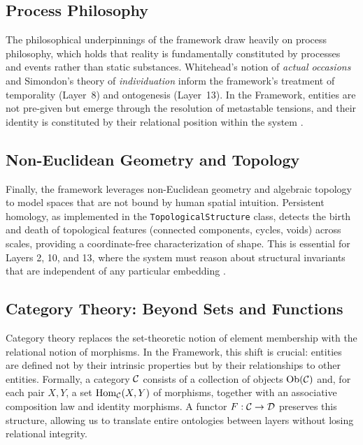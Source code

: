 \subsection{Process Philosophy}
The philosophical underpinnings of the framework draw heavily on process philosophy, which holds that reality is fundamentally constituted by processes and events rather than static substances. Whitehead's notion of \textit{actual occasions} and Simondon's theory of \textit{individuation} inform the framework's treatment of temporality (Layer~8) and ontogenesis (Layer~13). In the \Apeiron{} Framework, entities are not pre-given but emerge through the resolution of metastable tensions, and their identity is constituted by their relational position within the system \cite{simondon1992, prigogine1984}.

\subsection{Non-Euclidean Geometry and Topology}
Finally, the framework leverages non-Euclidean geometry and algebraic topology to model spaces that are not bound by human spatial intuition. Persistent homology, as implemented in the \texttt{TopologicalStructure} class, detects the birth and death of topological features (connected components, cycles, voids) across scales, providing a coordinate-free characterization of shape. This is essential for Layers 2, 10, and 13, where the system must reason about structural invariants that are independent of any particular embedding \cite{edelsbrunner2010}.

\subsection{Category Theory: Beyond Sets and Functions}
Category theory replaces the set-theoretic notion of element membership with the relational notion of morphisms. In the \Apeiron{} Framework, this shift is crucial: entities are defined not by their intrinsic properties but by their relationships to other entities. Formally, a category $\mathcal{C}$ consists of a collection of objects $\operatorname{Ob}(\mathcal{C})$ and, for each pair $X,Y$, a set $\operatorname{Hom}_{\mathcal{C}}(X,Y)$ of morphisms, together with an associative composition law and identity morphisms. A functor $F: \mathcal{C} \to \mathcal{D}$ preserves this structure, allowing us to translate entire ontologies between layers without losing relational integrity.

